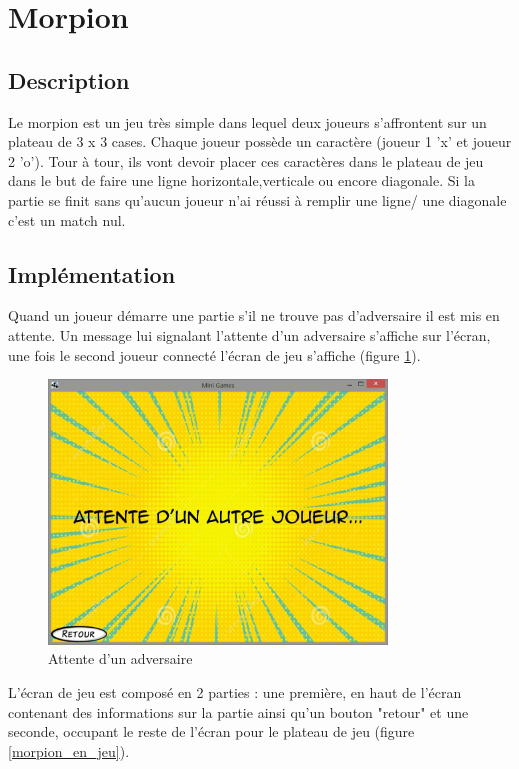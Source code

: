 \documentclass{report}
\begin{document}
\section{Morpion}
\label{Morpion}

\subsection{Description}
Le morpion est un jeu très simple dans lequel deux joueurs s'affrontent sur un plateau de 3 x 3 cases. Chaque joueur possède un caractère (joueur 1 'x' et joueur 2 'o').
Tour à tour, ils vont devoir placer ces caractères dans le plateau de jeu dans le but de faire une ligne horizontale,verticale ou encore diagonale.
Si la partie se finit sans qu'aucun joueur n'ai réussi à remplir une ligne/ une diagonale c'est un match nul.
\subsection{Implémentation}

Quand un joueur démarre une partie s'il ne trouve pas d'adversaire il est mis en attente. Un message lui signalant l'attente d'un
adversaire s'affiche sur l'écran, une fois le second joueur connecté l'écran de jeu s'affiche (figure \ref{attente_adversaire}).

\begin{figure}[H]
	\centering\includegraphics[width=9cm]{morpionwaiting}
	\caption{Attente d'un adversaire}
  \label{attente_adversaire}
\end{figure}

L'écran de jeu est composé en 2 parties : une première, en haut de l'écran contenant des informations sur la partie ainsi qu'un bouton "retour" et une seconde, occupant le reste de l'écran pour le plateau de jeu (figure \ref{morpion_en_jeu}).
\end{document}
